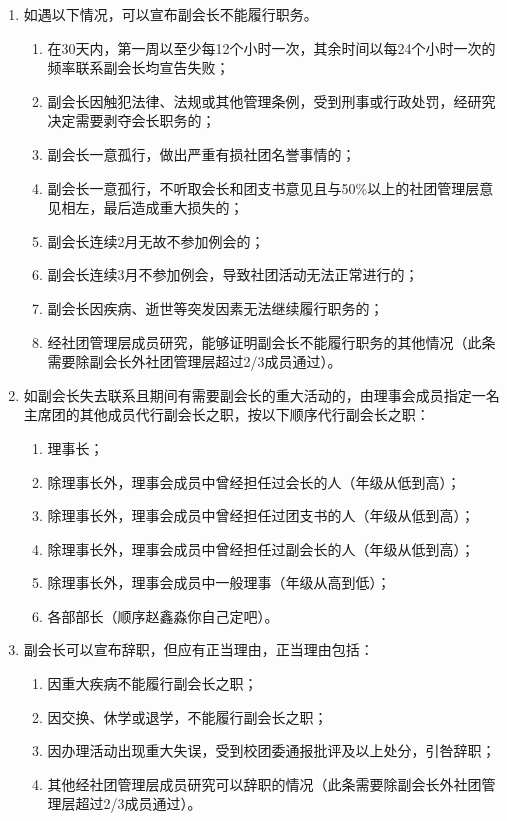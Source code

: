 \begin{enumerate}[resume]
    \item 如遇以下情况，可以宣布副会长不能履行职务。
    
    \begin{enumerate}
        \item 在30天内，第一周以至少每12个小时一次，其余时间以每24个小时一次的频率联系副会长均宣告失败；
        \item 副会长因触犯法律、法规或其他管理条例，受到刑事或行政处罚，经研究决定需要剥夺会长职务的；
        \item 副会长一意孤行，做出严重有损社团名誉事情的；
        \item 副会长一意孤行，不听取会长和团支书意见且与50\%以上的社团管理层意见相左，最后造成重大损失的；
        \item 副会长连续2月无故不参加例会的；
        \item 副会长连续3月不参加例会，导致社团活动无法正常进行的；
        \item 副会长因疾病、逝世等突发因素无法继续履行职务的；
        \item 经社团管理层成员研究，能够证明副会长不能履行职务的其他情况（此条需要除副会长外社团管理层超过2/3成员通过）。
    \end{enumerate}
    
    \item 如副会长失去联系且期间有需要副会长的重大活动的，由理事会成员指定一名主席团的其他成员代行副会长之职，按以下顺序代行副会长之职：
    
    \begin{enumerate}
        \item 理事长；
        \item 除理事长外，理事会成员中曾经担任过会长的人（年级从低到高）；
        \item 除理事长外，理事会成员中曾经担任过团支书的人（年级从低到高）；
        \item 除理事长外，理事会成员中曾经担任过副会长的人（年级从低到高）；
        \item 除理事长外，理事会成员中一般理事（年级从高到低）；
        \item 各部部长（顺序赵鑫淼你自己定吧）。
    \end{enumerate}
    
    \item 副会长可以宣布辞职，但应有正当理由，正当理由包括：
    
    \begin{enumerate}
        \item 因重大疾病不能履行副会长之职；
        \item 因交换、休学或退学，不能履行副会长之职；
        \item 因办理活动出现重大失误，受到校团委通报批评及以上处分，引咎辞职；
        \item 其他经社团管理层成员研究可以辞职的情况（此条需要除副会长外社团管理层超过2/3成员通过）。
    \end{enumerate}


\end{enumerate}
